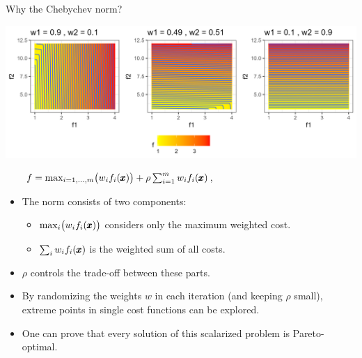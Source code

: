 \documentclass[11pt,compress,t,notes=noshow,xcolor=table]{beamer}
\begin{document}
\begin{vbframe}{Why the Chebychev norm?}

\begin{center}
\includegraphics[scale=0.08]{slides/11-multicrit/figure_man/parego_viz.png}
\end{center}

$\qquad f = \max_{i=1,\dots,m}\bigl(w_i f_i(\pmb{x})\bigr) 
    + \rho \sum_{i=1}^m w_i f_i(\pmb{x})$,
\begin{scriptsize}
\begin{itemize}
  \item The norm consists of two components:
    \begin{itemize}
      \item $\max_{i}\bigl(w_i f_i(\pmb{x})\bigr)$ 
            considers only the maximum weighted cost.
      \item $\sum_{i} w_if_i(\pmb{x})$ is the weighted sum of all costs.
    \end{itemize}
  \item $\rho$ controls the trade-off between these parts.
  \item By randomizing the weights $w$ in each iteration (and keeping $\rho$ small), 
        extreme points in single cost functions can be explored.
  \item One can prove that every solution of this scalarized problem is 
        Pareto-optimal.
\end{itemize}
\end{scriptsize}

\end{vbframe}
\end{document}
